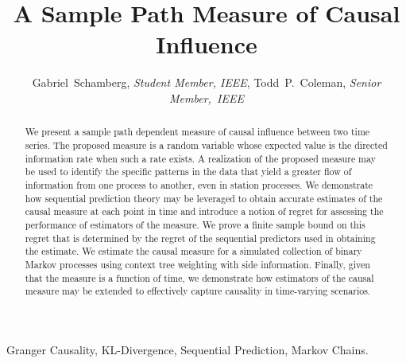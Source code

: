 \documentclass[conference]{IEEEtran}
\begin{document}
\title{A Sample Path Measure of Causal Influence}
%

\author{
Gabriel~Schamberg, \emph{Student Member, IEEE},
Todd~P.~Coleman, \emph{Senior Member,~IEEE}
}

\maketitle


\begin{abstract}
We present a sample path dependent measure of causal influence between two time series. The proposed measure is a random variable whose expected value is the directed information rate when such a rate exists. A realization of the proposed measure may be used to identify the specific patterns in the data that yield a greater flow of information from one process to another, even in station processes. We demonstrate how sequential prediction theory may be leveraged to obtain accurate estimates of the causal measure at each point in time and introduce a notion of regret for assessing the performance of estimators of the measure. We prove a finite sample bound on this regret that is determined by the regret of the sequential predictors used in obtaining the estimate. We estimate the causal measure for a simulated collection of binary Markov processes using context tree weighting with side information. Finally, given that the measure is a function of time, we demonstrate how estimators of the causal measure may be extended to effectively capture causality in time-varying scenarios.
\end{abstract}


\begin{IEEEkeywords}
Granger Causality, KL-Divergence, Sequential Prediction, Markov Chains.
\end{IEEEkeywords}

\IEEEpeerreviewmaketitle









\ifCLASSOPTIONcaptionsoff
  \newpage
\fi

\printbibliography
\end{document}

